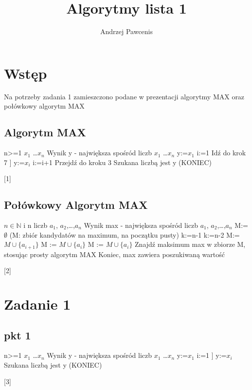 \documentclass{article}
\title{Algorytmy lista 1}
\author{Andrzej Pawcenis}
\begin{document}
	\maketitle
	\section{Wstęp}
		Na potrzeby zadania 1 zamieszczono podane w prezentacji algorytmy MAX oraz połówkowy algorytm MAX
			\subsection{Algorytm MAX}
				\begin{algorithmic}[1]
					\Require n>=1
					\Require \(x_1\) \dots \(x_n\)
					\State Wynik y - największa spośród liczb \(x_1\) \dots \(x_n\)
					\State[Krok 1] y:=\(x_1\)
					\State[Krok 2] i:=1
						\State[Krok 3] Idź do krok 7
					\EndIf
						\State[Krok 4]] y:=\(x_i\)
					\EndIf	
					\State[Krok 5] i:=i+1
					\State[Krok 6] Przejdź do kroku 3
					\State[Krok 7] Szukana liczbą jest y (KONIEC)
				\end{algorithmic}[1]
			\subsection{Połówkowy Algorytm MAX}
				\begin{algorithmic}[2]
				 	\Require $n \in \mathbb{N}$ i n liczb \(a_1\), \(a_2\),\dots,\(a_n\) 
				 	\State Wynik max - największa spośród liczb
				 	\(a_1\), \(a_2\),\dots,\(a_n\) 
				 	\State M:=$\emptyset$ (M: zbiór kandydatów na maximum, na początku pusty)
				 		\State k:=n-1
				 	\Else
				 		\State k:=n-2
				 	\EndIf
							\State M:= $M \cup \{a_{i+1}\}$
						\Else
							\State M := $M \cup \{a_i\}$	
						\EndIf
				 	\EndFor
				 		\State M := $M \cup \{a_i\}$
				 	\EndIf
				 	\State Znajdź maksimum max w zbiorze M, stosując prosty algorytm MAX
				 	\State Koniec, max zawiera poszukiwaną wartość
				\end{algorithmic}[2]
		\section{Zadanie 1}
			\subsection{pkt 1}
				\begin{algorithmic}[3]
					\Require n>=1
					\Require \(x_1\) \dots \(x_n\)
					\State Wynik y - największa spośród liczb \(x_1\) \dots \(x_n\)
					\State[Krok 1] y:=\(x_1\)
					\State[Krok 2] i:=1
					\State[Krok 3]] y:=\(x_i\)
					\EndIf	
					\EndFor
					\State[Krok 4] Szukana liczbą jest y (KONIEC)
				\end{algorithmic}[3]
\end{document}
